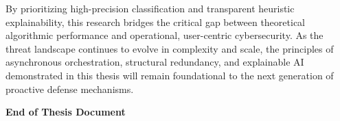 By prioritizing high-precision classification and transparent heuristic
explainability, this research bridges the critical gap between
theoretical algorithmic performance and operational, user-centric
cybersecurity. As the threat landscape continues to evolve in complexity
and scale, the principles of asynchronous orchestration, structural
redundancy, and explainable AI demonstrated in this thesis will remain
foundational to the next generation of proactive defense mechanisms.

\textbf{End of Thesis Document}


